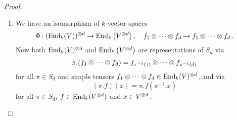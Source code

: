 \begin{proof}
  \leavevmode
  \begin{enumerate}
    \item
      We have an isomorphism of $k$-vector spaces
      \begin{align*}
                \Phi
        \colon  (\operatorname{End}_k(V))^{\mathbin{\otimes} d}
        \to     \operatorname{End}_k\left( V^{\mathbin{\otimes} d} \right),
        \quad   f_1 \mathbin{\otimes} \dotsb \mathbin{\otimes} f_d
        \mapsto f_1 \mathbin{\otimes} \dotsb \mathbin{\otimes} f_d \,.
      \end{align*}
      Now both $\operatorname{End}_k(V)^{\mathbin{\otimes} d}$ and $\operatorname{End}_k\left( V^{\mathbin{\otimes} d} \right)$ are representations of $S_d$ via
      \[
          \pi.(f_1 \mathbin{\otimes} \dotsb \mathbin{\otimes} f_d)
        = f_{\pi^{-1}(1)} \mathbin{\otimes} \dotsb \mathbin{\otimes} f_{\pi^{-1}(d)}
      \]
      for all $\pi \in S_d$ and simple tensors $f_1 \mathbin{\otimes} \dotsb \mathbin{\otimes} f_d \in \operatorname{End}_k(V)^{\mathbin{\otimes} d}$, and via
      \[
          (\pi.f)(x)
        = \pi.f\left( \pi^{-1}.x \right)
      \]
      for all $\pi \in S_d$, $f \in \operatorname{End}_k(V^{\mathbin{\otimes} d})$ and $x \in V^{\mathbin{\otimes} d}$.
      

\end{enumerate}
\end{proof}
